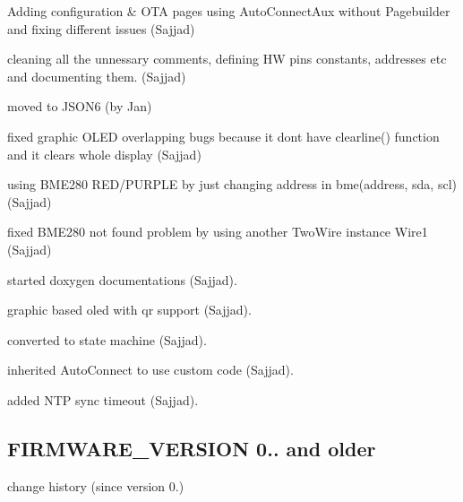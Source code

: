 \begin{DoxyItemize}
\begin{DoxyItemize}
\item Adding configuration \& O\+TA pages using Auto\+Connect\+Aux without Pagebuilder and fixing different issues (Sajjad)
\item cleaning all the unnessary comments, defining HW pins constants, addresses etc and documenting them. (Sajjad)
\item moved to J\+S\+O\+N6 (by Jan)
\item fixed graphic O\+L\+ED overlapping bugs because it don\textquotesingle{}t have clearline() function and it clears whole display (Sajjad)
\item using B\+M\+E280 R\+E\+D/\+P\+U\+R\+P\+LE by just changing address in bme(address, sda, scl) (Sajjad)
\item fixed B\+M\+E280 not found problem by using another Two\+Wire instance Wire1 (Sajjad)
\item started doxygen documentations (Sajjad).
\item graphic based oled with qr support (Sajjad).
\item converted to state machine (Sajjad).
\item inherited Auto\+Connect to use custom code (Sajjad).
\item added N\+TP sync timeout (Sajjad).
\end{DoxyItemize}
\end{DoxyItemize}\hypertarget{index_log1}{}\subsection{F\+I\+R\+M\+W\+A\+R\+E\+\_\+\+V\+E\+R\+S\+I\+O\+N 0.. and older}\label{index_log1}
change history (since version 0.)
